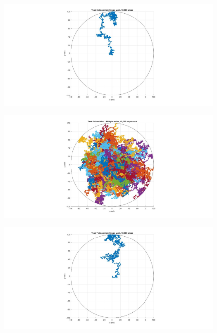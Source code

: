 \documentclass[10pt, a4paper]{article}
\begin{document}
\begin{figure}[H]
    \includegraphics[width=\textwidth]{Diagrams/Task 5 Testing/single_walk_task_5.jpeg}
    \caption{}
    \label{fig:6}
\end{figure}

\begin{figure}[H]
    \includegraphics[width=\textwidth]{Diagrams/Task 5 Testing/multiple_walks_task_5.jpeg}
    \caption{}
    \label{fig:7}
\end{figure}

\begin{figure}[H]
    \includegraphics[width=\textwidth]{Diagrams/Task 7 Testing/single_walk_task_7.jpeg}
    \caption{}
    \label{fig:8}
\end{figure}
\end{document}
